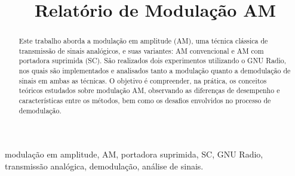 \documentclass[conference]{IEEEtran}
\begin{document}
\title{Relatório de Modulação AM}

\author{
}

\maketitle

\fancyhead{}

\begin{abstract}
Este trabalho aborda a modulação em amplitude (AM), uma técnica clássica de transmissão de sinais analógicos, e suas variantes: AM convencional e AM com portadora suprimida (SC). São realizados dois experimentos utilizando o GNU Radio, nos quais são implementados e analisados tanto a modulação quanto a demodulação de sinais em ambas as técnicas. O objetivo é compreender, na prática, os conceitos teóricos estudados sobre modulação AM, observando as diferenças de desempenho e características entre os métodos, bem como os desafios envolvidos no processo de demodulação.
\end{abstract}

\begin{IEEEkeywords}
modulação em amplitude, AM, portadora suprimida, SC, GNU Radio, transmissão analógica, demodulação, análise de sinais.
\end{IEEEkeywords}



% 





\vspace{12pt}
\end{document}
